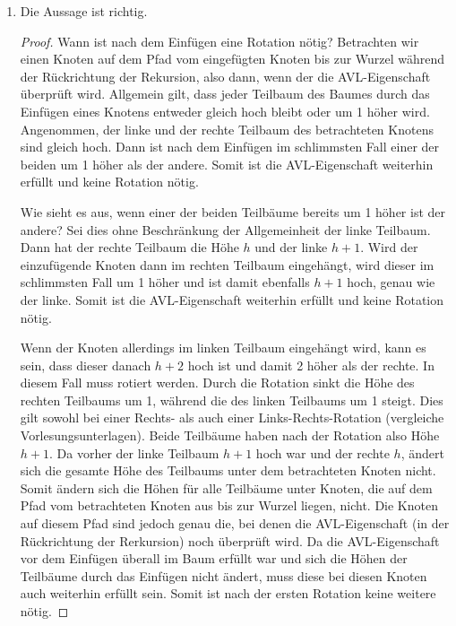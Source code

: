 \documentclass[11pt,a4paper]{article}
\begin{document}
\begin{loesung}
\begin{enumerate}
        \item Die Aussage ist richtig.
        \begin{proof}
        Wann ist nach dem Einfügen eine Rotation nötig?
        Betrachten wir einen Knoten auf dem Pfad vom eingefügten Knoten bis zur Wurzel während der Rückrichtung der Rekursion, also dann, wenn der die AVL-Eigenschaft überprüft wird.
        Allgemein gilt, dass jeder Teilbaum des Baumes durch das Einfügen eines Knotens entweder gleich hoch bleibt oder um 1 höher wird.
        Angenommen, der linke und der rechte Teilbaum des betrachteten Knotens sind gleich hoch.
        Dann ist nach dem Einfügen im schlimmsten Fall einer der beiden um 1 höher als der andere.
        Somit ist die AVL-Eigenschaft weiterhin erfüllt und keine Rotation nötig.

        Wie sieht es aus, wenn einer der beiden Teilbäume bereits um 1 höher ist der andere?
        Sei dies ohne Beschränkung der Allgemeinheit der linke Teilbaum.
        Dann hat der rechte Teilbaum die Höhe $h$ und der linke $h + 1$.
        Wird der einzufügende Knoten dann im rechten Teilbaum eingehängt, wird dieser im schlimmsten Fall um 1 höher und ist damit ebenfalls $h + 1$ hoch, genau wie der linke.
        Somit ist die AVL-Eigenschaft weiterhin erfüllt und keine Rotation nötig.

        Wenn der Knoten allerdings im linken Teilbaum eingehängt wird, kann es sein, dass dieser danach $h + 2$ hoch ist und damit 2 höher als der rechte.
        In diesem Fall muss rotiert werden.
        Durch die Rotation sinkt die Höhe des rechten Teilbaums um 1, während die des linken Teilbaums um 1 steigt.
        Dies gilt sowohl bei einer Rechts- als auch einer Links-Rechts-Rotation (vergleiche Vorlesungsunterlagen).
        Beide Teilbäume haben nach der Rotation also Höhe $h + 1$.
        Da vorher der linke Teilbaum $h + 1$ hoch war und der rechte $h$, ändert sich die gesamte Höhe des Teilbaums unter dem betrachteten Knoten nicht.
        Somit ändern sich die Höhen für alle Teilbäume unter Knoten, die auf dem Pfad vom betrachteten Knoten aus bis zur Wurzel liegen, nicht.
        Die Knoten auf diesem Pfad sind jedoch genau die, bei denen die AVL-Eigenschaft (in der Rückrichtung der Rerkursion) noch überprüft wird.
        Da die AVL-Eigenschaft vor dem Einfügen überall im Baum erfüllt war und sich die Höhen der Teilbäume durch das Einfügen nicht ändert, muss diese bei diesen Knoten auch weiterhin erfüllt sein.
        Somit ist nach der ersten Rotation keine weitere nötig.
        \end{proof}


\end{enumerate}
\end{loesung}
\end{document}
